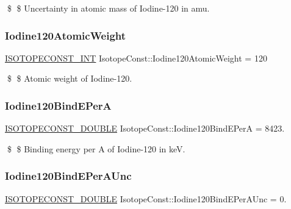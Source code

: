 \$ \$ Uncertainty in atomic mass of Iodine-\/120 in amu. \mbox{\label{group___isotope_const-_iodine-_i120_ga21ff2a72e2382c1277f8fb7727cc2d6f}} 
\subsubsection{\texorpdfstring{Iodine120\+Atomic\+Weight}{Iodine120AtomicWeight}}
{\footnotesize\ttfamily \mbox{\hyperlink{group___isotope_const-_macros_ga5f18360b3e99483a35c32d789e62621c}{I\+S\+O\+T\+O\+P\+E\+C\+O\+N\+S\+T\+\_\+\+I\+NT}} Isotope\+Const\+::\+Iodine120\+Atomic\+Weight = 120}

\$ \$ Atomic weight of Iodine-\/120. \mbox{\label{group___isotope_const-_iodine-_i120_gac5da1eb0cc2b02bfeb4645f840e9e0be}} 
\subsubsection{\texorpdfstring{Iodine120\+Bind\+E\+PerA}{Iodine120BindEPerA}}
{\footnotesize\ttfamily \mbox{\hyperlink{group___isotope_const-_macros_ga8f45a7272ce02c0b4c65c44636ed719a}{I\+S\+O\+T\+O\+P\+E\+C\+O\+N\+S\+T\+\_\+\+D\+O\+U\+B\+LE}} Isotope\+Const\+::\+Iodine120\+Bind\+E\+PerA = 8423.}

\$ \$ Binding energy per A of Iodine-\/120 in keV. \mbox{\label{group___isotope_const-_iodine-_i120_ga25d63e0eb7c98196cecaceb1efc41711}} 
\subsubsection{\texorpdfstring{Iodine120\+Bind\+E\+Per\+A\+Unc}{Iodine120BindEPerAUnc}}
{\footnotesize\ttfamily \mbox{\hyperlink{group___isotope_const-_macros_ga8f45a7272ce02c0b4c65c44636ed719a}{I\+S\+O\+T\+O\+P\+E\+C\+O\+N\+S\+T\+\_\+\+D\+O\+U\+B\+LE}} Isotope\+Const\+::\+Iodine120\+Bind\+E\+Per\+A\+Unc = 0.}

